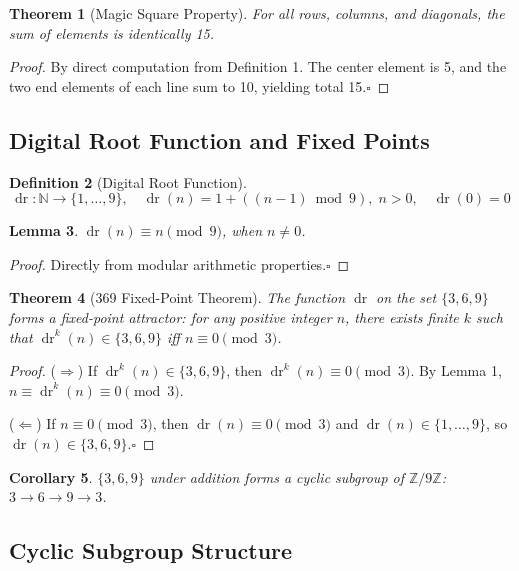 \documentclass[conference]{IEEEtran}
\newtheorem{theorem}{Theorem}[section]
\newtheorem{lemma}[theorem]{Lemma}
\newtheorem{corollary}[theorem]{Corollary}
\newtheorem{definition}[theorem]{Definition}
\theoremstyle{remark}
\newcommand{\Z}{\mathbb{Z}}
\newcommand{\N}{\mathbb{N}}
\newcommand{\dr}{\operatorname{dr}}
\begin{document}
\begin{theorem}[Magic Square Property]
For all rows, columns, and diagonals, the sum of elements is identically 15.
\end{theorem}
\begin{proof}
By direct computation from Definition 1. The center element is 5, and the two end elements of each line sum to 10, yielding total 15.\hfill$\square$
\end{proof}

\subsection{Digital Root Function and Fixed Points}

\begin{definition}[Digital Root Function]
\[
\dr: \N \to \{1,\ldots,9\},\quad
\dr(n) = 1 + ((n-1) \bmod 9),\; n>0,\quad \dr(0)=0
\]
\end{definition}

\begin{lemma}
$\dr(n) \equiv n \pmod{9}$, when $n \neq 0$.
\end{lemma}
\begin{proof}
Directly from modular arithmetic properties.\hfill$\square$
\end{proof}

\begin{theorem}[369 Fixed-Point Theorem]
The function $\dr$ on the set $\{3,6,9\}$ forms a fixed-point attractor: for any positive integer $n$, there exists finite $k$ such that $\dr^k(n) \in \{3,6,9\}$ iff $n \equiv 0 \pmod{3}$.
\end{theorem}
\begin{proof}
($\Rightarrow$) If $\dr^k(n) \in \{3,6,9\}$, then $\dr^k(n) \equiv 0 \pmod{3}$. By Lemma 1, $n \equiv \dr^k(n) \equiv 0 \pmod{3}$.

($\Leftarrow$) If $n \equiv 0 \pmod{3}$, then $\dr(n) \equiv 0 \pmod{3}$ and $\dr(n) \in \{1,\ldots,9\}$, so $\dr(n) \in \{3,6,9\}$.\hfill$\square$
\end{proof}

\begin{corollary}
$\{3,6,9\}$ under addition forms a cyclic subgroup of $\Z/9\Z$: $3 \to 6 \to 9 \to 3$.
\end{corollary}

\subsection{Cyclic Subgroup Structure}
\end{document}
